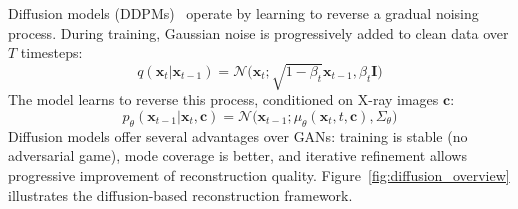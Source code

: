 \documentclass[10pt,twocolumn,a4paper]{article}
\begin{document}
Diffusion models (DDPMs)~\cite{ho2020ddpm} operate by learning to reverse a
gradual noising process. During training, Gaussian noise is progressively added
to clean data over $T$ timesteps:
\begin{equation}
q(\mathbf{x}_t|\mathbf{x}_{t-1}) =
\mathcal{N}\!\bigl(\mathbf{x}_t;\sqrt{1-\beta_t}\mathbf{x}_{t-1},\beta_t\mathbf{I}\bigr)
\label{eq:forward}
\end{equation}
The model learns to reverse this process, conditioned on X-ray images
$\mathbf{c}$:
\begin{equation}
p_\theta(\mathbf{x}_{t-1}|\mathbf{x}_t, \mathbf{c}) =
\mathcal{N}\!\bigl(\mathbf{x}_{t-1};\mu_\theta(\mathbf{x}_t,t,\mathbf{c}),\Sigma_\theta\bigr)
\label{eq:reverse}
\end{equation}
Diffusion models offer several advantages over GANs: training is stable (no
adversarial game), mode coverage is better, and iterative refinement allows
progressive improvement of reconstruction quality. Figure~\ref{fig:diffusion_overview}
illustrates the diffusion-based reconstruction framework.
\end{document}
